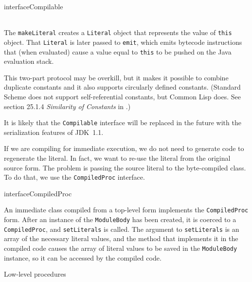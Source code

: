 \documentclass[twocolumn]{article}
\makeatletter
\def\section{\@startsection {section}{1}{\z@}
   {14pt plus 2pt minus 2pt}{12pt plus 2pt minus 2pt} {\large\bf}}
\makeatother
\begin{document}
\begin{ClassNoDots}{interface}{Compilable}{}
\\
\\
\end{ClassNoDots}

The {\tt makeLiteral} creates a {\tt Literal} object
that represents the value of {\tt this} object.
That {\tt Literal} is later passed to {\tt emit}, which emits
bytecode instructions that (when evaluated) cause a value
equal to {\tt this} to be pushed on the Java evaluation stack.

This two-part protocol may be overkill, but it makes it
possible to combine duplicate constants and it also
supports circularly defined constants.  (Standard Scheme does not
support self-referential constants, but Common Lisp does.
See section 25.1.4 {\it Similarity of Constants} in
\cite{Steele:common-lisp-2}.)

It is likely that the {\tt Compilable} interface will
be replaced in the future with the serialization features
of JDK~1.1.

If we are compiling for immediate execution, we do not need
to generate code to regenerate the literal.  In fact, we want to
re-use the literal from the original source form.
The problem is passing the source literal to the
byte-compiled class.  To do that, we use the {\tt CompiledProc}
interface.

\begin{ClassNoDots}{interface}{CompiledProc}{}
\\
\end{ClassNoDots}

An immediate class compiled from a top-level form implements
the {\tt CompiledProc} form.  After an instance of the {\tt ModuleBody}
has been created, it is coerced to a {\tt CompiledProc}, and
{\tt setLiterals} is called.  The argument to {\tt setLiterals}
is an array of the necessary literal values, and the method
that implements it in the compiled code causes the array of literal
values to be saved in the {\tt ModuleBody} instance, so it can
be accessed by the compiled code.

\section{Low-level procedures}
\end{document}
